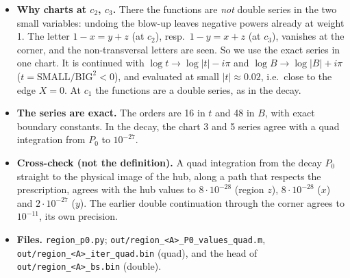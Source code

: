 \documentclass[11pt]{article}
\begin{document}
\begin{itemize}
\item \textbf{Why charts at $c_2$, $c_3$.} There the functions are \emph{not} double series in the two small variables:
  undoing the blow-up leaves negative powers already at weight 1. The letter $1-x=y+z$ (at $c_2$), resp.\ $1-y=x+z$ (at
  $c_3$), vanishes at the corner, and the non-transversal letters are seen. So we use the exact series in one chart.
  It is continued with $\log t\to\log|t|-i\pi$ and $\log B\to\log|B|+i\pi$ ($t=\text{SMALL}/\text{BIG}^2<0$), and
  evaluated at small $|t|\approx0.02$, i.e.\ close to the edge $X=0$. At $c_1$ the functions are a double series, as in
  the decay.
\item \textbf{The series are exact.} The orders are 16 in $t$ and 48 in $B$, with exact boundary constants. In the decay,
  the chart 3 and 5 series agree with a quad integration from $P_0$ to $10^{-27}$.
\item \textbf{Cross-check (not the definition).} A quad integration from the decay $P_0$ straight to the physical image
  of the hub, along a path that respects the prescription, agrees with the hub values to $8\cdot10^{-28}$ (region $z$),
  $8\cdot10^{-28}$ ($x$) and $2\cdot10^{-27}$ ($y$). The earlier double continuation through the corner agrees to
  $10^{-11}$, its own precision.
\item \sloppy\textbf{Files.} \texttt{region\_p0.py}; \texttt{out/region\_<A>\_P0\_values\_quad.m},
  \texttt{out/region\_<A>\_iter\_quad.bin} (quad), and the head of \texttt{out/region\_<A>\_bs.bin} (double).
\end{itemize}
\end{document}
